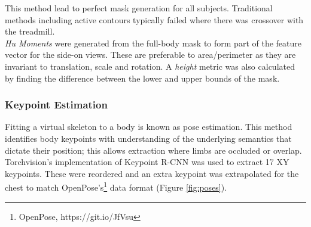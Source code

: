 \documentclass[conference]{IEEEtran}
\begin{document}
\noindent This method lead to perfect mask generation for all subjects. Traditional methods including active contours typically failed where there was crossover with the treadmill.\\

\noindent \textit{Hu Moments} were generated from the full-body mask to form part of the feature vector for the side-on views. These are preferable to area/perimeter as they are invariant to translation, scale and rotation. A \textit{height} metric was also calculated by finding the difference between the lower and upper bounds of the mask. \\

\subsubsection{Keypoint Estimation}
 Fitting a virtual skeleton to a body is known as pose estimation. This method identifies body keypoints with understanding of the underlying semantics that dictate their position; this allows extraction where limbs are occluded or overlap. Torchvision's implementation of Keypoint R-CNN \cite{he2017mask} was used to extract 17 XY keypoints. These were reordered and an extra keypoint was extrapolated for the chest to match OpenPose's\footnote{OpenPose, https://git.io/JfVsu} data format (Figure \ref{fig:poses}).
\end{document}
